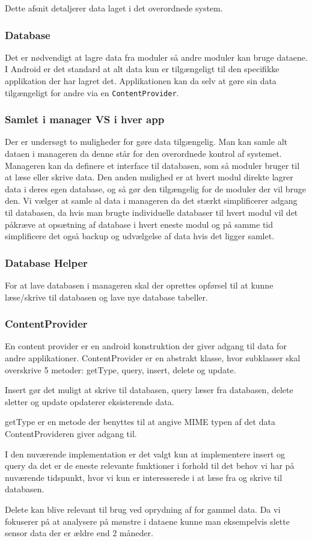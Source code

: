 Dette afsnit detaljerer data laget i det overordnede system. 

\subsubsection{Database}
Det er nødvendigt at lagre data fra moduler så andre moduler kan bruge dataene.
I Android er det standard at alt data kun er tilgængeligt til den specifikke applikation der har lagret det.
Applikationen kan da selv at gøre sin data tilgængeligt for andre via en \texttt{ContentProvider}.

\subsubsection{Samlet i manager VS i hver app}
Der er undersøgt to muligheder for gøre data tilgængelig.
Man kan samle alt dataen i manageren da denne står for den overordnede kontrol af systemet. 
Manageren kan da definere et interface til databasen, som så moduler bruger til at læse eller skrive data. 
Den anden mulighed er at hvert modul direkte lagrer data i deres egen database, og så gør den tilgængelig for de moduler der vil bruge den.
Vi vælger at samle al data i manageren da det stærkt simplificerer adgang til databasen, da hvis man brugte individuelle databaser til hvert modul vil det påkræve at opsætning af database i hvert eneste modul og på samme tid simplificere det også backup og udvælgelse af data hvis det ligger samlet.

\subsubsection{Database Helper}
For at lave databasen i manageren skal der oprettes opførsel til at kunne læse/skrive til databasen og lave nye database tabeller.

\subsubsection{ContentProvider}
En content provider er en android konstruktion der giver adgang til data for andre applikationer.
ContentProvider er en abstrakt klasse, hvor subklasser skal overskrive 5 metoder:  getType, query, insert, delete og update. \cite{contentprovider}

Insert gør det muligt at skrive til databasen, query læser fra databasen, delete sletter og update opdaterer eksisterende data.

getType er en metode der benyttes til at angive MIME typen af det data ContentProvideren giver adgang til.

I den nuværende implementation er det valgt kun at implementere insert og query da det er de eneste relevante funktioner i forhold til det behov vi har på nuværende tidspunkt, hvor vi kun er interesserede i at læse fra og skrive til databasen.

Delete kan blive relevant til brug ved oprydning af for gammel data. Da vi fokuserer på at analysere på mønstre i dataene kunne man eksempelvis slette sensor data der er ældre end 2 måneder.

